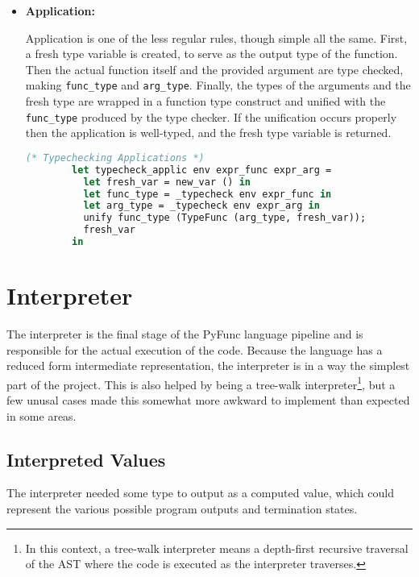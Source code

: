 \documentclass{l4proj}
\begin{document}
\begin{itemize}
    \item \textbf{Application:}
    
    Application is one of the less regular rules, though simple all the same.
    First, a fresh type variable is created, to serve as the output type of the function.
    Then the actual function itself and the provided argument are type checked, making \texttt{func\_type} and \texttt{arg\_type}.
    Finally, the types of the arguments and the fresh type are wrapped in a function type construct and unified with the \texttt{func\_type} produced by the type checker.
    If the unification occurs properly then the application is well-typed, and the fresh type variable is returned.
    \begin{lstlisting}[language=Caml, caption=PyFunc Typechecker's typecheck\_applic function. If no error is produced then the provided application code is well-typed.]
        (* Typechecking Applications *)
        let typecheck_applic env expr_func expr_arg =
          let fresh_var = new_var () in
          let func_type = _typecheck env expr_func in
          let arg_type = _typecheck env expr_arg in
          unify func_type (TypeFunc (arg_type, fresh_var));
          fresh_var
        in
    \end{lstlisting}
\end{itemize}

\section{Interpreter}

The interpreter is the final stage of the PyFunc language pipeline and is responsible for the actual execution of the code.
Because the language has a reduced form intermediate representation, the interpreter is in a way the simplest part of the project.
This is also helped by being a tree-walk interpreter\footnote{In this context, a tree-walk interpreter means a depth-first recursive traversal of the AST where the code is executed as the interpreter traverses.}, but a few unusal cases made this somewhat more awkward to implement than expected in some areas.

\subsection{Interpreted Values}

The interpreter needed some type to output as a computed value, which could represent the various possible program outputs and termination states.
\end{document}
